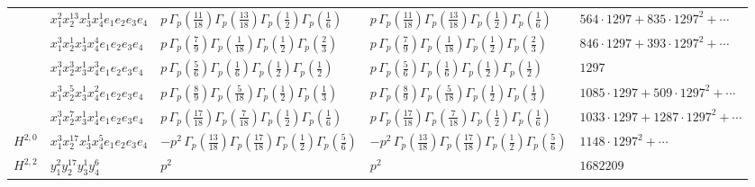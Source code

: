 \documentclass[11pt]{article}
\begin{document}
\begin{table}[ht]
{\begin{tabular}{@{}lllll@{}}
 & $x_{1}^{2} x_{2}^{13} x_{3}^{1} x_{4}^{1}  e_{1} e_{2} e_{3} e_{4}$ & $p \, \Gamma_p \left( \frac{11}{18} \right) \Gamma_p \left( \frac{13}{18} \right) \Gamma_p \left( \frac{1}{2} \right) \Gamma_p \left( \frac{1}{6} \right)$ & $p \, \Gamma_p \left( \frac{11}{18} \right) \Gamma_p \left( \frac{13}{18} \right) \Gamma_p \left( \frac{1}{2} \right) \Gamma_p \left( \frac{1}{6} \right)$ & $564{\cdot}1297{+}835{\cdot}1297^{2}{+}\cdots$ \\
 & $x_{1}^{3} x_{2}^{1} x_{3}^{1} x_{4}^{4}  e_{1} e_{2} e_{3} e_{4}$ & $p \, \Gamma_p \left( \frac{7}{9} \right) \Gamma_p \left( \frac{1}{18} \right) \Gamma_p \left( \frac{1}{2} \right) \Gamma_p \left( \frac{2}{3} \right)$ & $p \, \Gamma_p \left( \frac{7}{9} \right) \Gamma_p \left( \frac{1}{18} \right) \Gamma_p \left( \frac{1}{2} \right) \Gamma_p \left( \frac{2}{3} \right)$ & $846{\cdot}1297{+}393{\cdot}1297^{2}{+}\cdots$ \\
 & $x_{1}^{3} x_{2}^{3} x_{3}^{1} x_{4}^{3}  e_{1} e_{2} e_{3} e_{4}$ & $p \, \Gamma_p \left( \frac{5}{6} \right) \Gamma_p \left( \frac{1}{6} \right) \Gamma_p \left( \frac{1}{2} \right) \Gamma_p \left( \frac{1}{2} \right)$ & $p \, \Gamma_p \left( \frac{5}{6} \right) \Gamma_p \left( \frac{1}{6} \right) \Gamma_p \left( \frac{1}{2} \right) \Gamma_p \left( \frac{1}{2} \right)$ & $1297$ \\
 & $x_{1}^{3} x_{2}^{5} x_{3}^{1} x_{4}^{2}  e_{1} e_{2} e_{3} e_{4}$ & $p \, \Gamma_p \left( \frac{8}{9} \right) \Gamma_p \left( \frac{5}{18} \right) \Gamma_p \left( \frac{1}{2} \right) \Gamma_p \left( \frac{1}{3} \right)$ & $p \, \Gamma_p \left( \frac{8}{9} \right) \Gamma_p \left( \frac{5}{18} \right) \Gamma_p \left( \frac{1}{2} \right) \Gamma_p \left( \frac{1}{3} \right)$ & $1085{\cdot}1297{+}509{\cdot}1297^{2}{+}\cdots$ \\
 & $x_{1}^{3} x_{2}^{7} x_{3}^{1} x_{4}^{1}  e_{1} e_{2} e_{3} e_{4}$ & $p \, \Gamma_p \left( \frac{17}{18} \right) \Gamma_p \left( \frac{7}{18} \right) \Gamma_p \left( \frac{1}{2} \right) \Gamma_p \left( \frac{1}{6} \right)$ & $p \, \Gamma_p \left( \frac{17}{18} \right) \Gamma_p \left( \frac{7}{18} \right) \Gamma_p \left( \frac{1}{2} \right) \Gamma_p \left( \frac{1}{6} \right)$ & $1033{\cdot}1297{+}1287{\cdot}1297^{2}{+}\cdots$ \\
\midrule
$H^{2,0}$ & $x_{1}^{3} x_{2}^{17} x_{3}^{1} x_{4}^{5}  e_{1} e_{2} e_{3} e_{4}$ & $- p^{2} \, \Gamma_p \left( \frac{13}{18} \right) \Gamma_p \left( \frac{17}{18} \right) \Gamma_p \left( \frac{1}{2} \right) \Gamma_p \left( \frac{5}{6} \right)$ & $- p^{2} \, \Gamma_p \left( \frac{13}{18} \right) \Gamma_p \left( \frac{17}{18} \right) \Gamma_p \left( \frac{1}{2} \right) \Gamma_p \left( \frac{5}{6} \right)$ & $1148{\cdot}1297^{2}{+}\cdots$ \\
\midrule
$H^{2,2}$ & $y_{1}^{2} y_{2}^{17} y_{3}^{1} y_{4}^{6}$ & $p^{2} \,$ & $p^{2} \,$ & $1682209$ \\
\bottomrule
\end{tabular}
}
\renewcommand{\arraystretch}{1.0}
\end{table}
\end{document}
